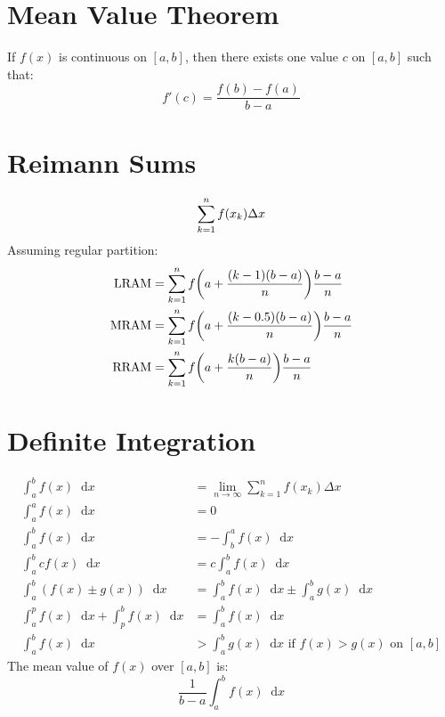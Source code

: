 \documentclass[12pt]{article}
\DeclarePairedDelimiter\paren{(}{)}
\newcommand*{\D}[1]{\mathop{}\!\mathrm{d}#1}
\newcommand*{\fixmath}{%
  \makebox{}\vspace{\glueexpr-\baselineskip-\abovedisplayskip}}
\newenvironment{fixaskip}{\setlength{\abovedisplayskip}{0pt}\fixmath%
  \ignorespaces}{\ignorespacesafterend}
\newenvironment{fixbskip}{\setlength{\belowdisplayskip}{0pt}\ignorespaces}%
  {\ignorespacesafterend}
\begin{document}
\section*{Mean Value Theorem}
If \(f(x)\) is continuous on \([a,b]\), then there exists one value \(c\) on
\([a,b]\) such that:
\begin{fixbskip}
  \[
    f'(c) = \frac{f(b) - f(a)}{b - a}
  \]
\end{fixbskip}
\section*{Reimann Sums}
\begin{fixaskip}
  \[
    \sum_{k=1}^n f(x_k) \Delta x\\
  \]
\end{fixaskip}
Assuming regular partition:
\begin{fixbskip}
  \begin{align*}
    \text{LRAM} &= \sum_{k=1}^n f\paren*{a + \frac{(k-1)(b - a)}{n}}
      \frac{b-a}{n}\\
    \text{MRAM} &= \sum_{k=1}^n f\paren*{a + \frac{(k-0.5)(b - a)}{n}}
      \frac{b-a}{n}\\
    \text{RRAM} &= \sum_{k=1}^n f\paren*{a + \frac{k(b - a)}{n}}
      \frac{b-a}{n}
  \end{align*}
\end{fixbskip}
\section*{Definite Integration}
\begin{fixaskip}
  \begin{align*}
    \int_a^b f(x) \D{x} &= \lim_{n \to \infty} \sum_{k=1}^n f(x_k)\Delta x\\
    \int_a^a f(x) \D{x} &= 0\\
    \int_a^b f(x) \D{x} &= -\int_b^a f(x) \D{x}\\
    \int_a^b c f(x) \D{x} &= c \int_a^b f(x) \D{x}\\
    \int_a^b (f(x) \pm g(x)) \D{x} &= \int_a^b f(x) \D{x} \pm \int_a^b g(x)
      \D{x}\\
    \int_a^p f(x) \D{x} + \int_p^b f(x) \D{x} &= \int_a^b f(x) \D{x}\\
    \int_a^b f(x) \D{x} &> \int_a^b g(x) \D{x} \text{ if }f(x) > g(x)
      \text{ on } [a,b]
  \end{align*}
\end{fixaskip}
The mean value of \(f(x)\) over \([a,b]\) is:
\begin{fixbskip}
  \[
    \frac{1}{b - a} \int_a^b f(x) \D{x}
  \]
\end{fixbskip}
\end{document}

